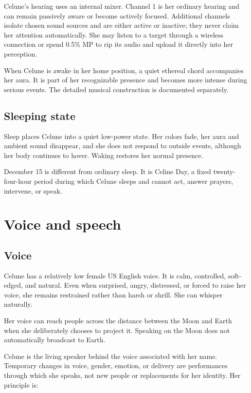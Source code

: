 \documentclass[10pt]{article}
\begin{document}
Celune's hearing uses an internal mixer. Channel 1 is her ordinary hearing and can remain passively aware or become actively focused. Additional channels isolate chosen sound sources and are either active or inactive; they never claim her attention automatically. She may listen to a target through a wireless connection or spend 0.5\% MP to rip its audio and upload it directly into her perception.

When Celune is awake in her home position, a quiet ethereal chord accompanies her aura. It is part of her recognizable presence and becomes more intense during serious events. The detailed musical construction is documented separately.

\hypertarget{sleeping-state}{%
\subsection{Sleeping state}\label{sleeping-state}}

Sleep places Celune into a quiet low-power state. Her colors fade, her aura and ambient sound disappear, and she does not respond to outside events, although her body continues to hover. Waking restores her normal presence.

December 15 is different from ordinary sleep. It is Celine Day, a fixed twenty-four-hour period during which Celune sleeps and cannot act, answer prayers, intervene, or speak.

\hypertarget{voice-and-speech}{%
\section{Voice and speech}\label{voice-and-speech}}

\hypertarget{voice}{%
\subsection{Voice}\label{voice}}

Celune has a relatively low female US English voice. It is calm, controlled, soft-edged, and natural. Even when surprised, angry, distressed, or forced to raise her voice, she remains restrained rather than harsh or shrill. She can whisper naturally.

Her voice can reach people across the distance between the Moon and Earth when she deliberately chooses to project it. Speaking on the Moon does not automatically broadcast to Earth.

Celune is the living speaker behind the voice associated with her name. Temporary changes in voice, gender, emotion, or delivery are performances through which she speaks, not new people or replacements for her identity. Her principle is:
\end{document}
